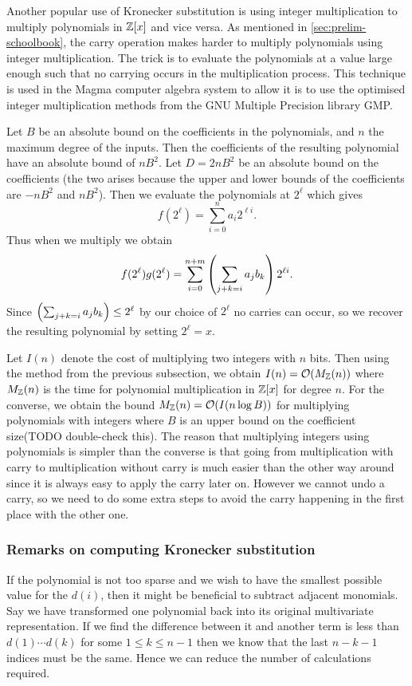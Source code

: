 Another popular use of Kronecker substitution is using integer multiplication to multiply polynomials in ${\mathbb Z}[x]$ and vice versa. As mentioned in \ref{sec:prelim-schoolbook}, the carry operation makes harder to multiply polynomials using integer multiplication. The trick is to evaluate the polynomials at a value large enough such that no carrying occurs in the multiplication process. This technique is used in the Magma computer algebra system to allow it is to use the optimised integer multiplication methods from the GNU Multiple Precision library GMP.

Let $B$ be an absolute bound on the coefficients in the polynomials, and $n$ the maximum degree of the inputs. Then the coefficients of the resulting polynomial have an absolute bound of $nB^2$. Let $D = 2nB^2$ be an absolute bound on the coefficients (the two arises because the upper and lower bounds of the coefficients are $-nB^2$ and $nB^2$). Then we evaluate the polynomials at $2^\ell$ which gives
\[
    f(2^\ell) = \sum^n_{i = 0} a_i 2^{\ell i}.
\]
Thus when we multiply we obtain
\[
    f(2^\ell)g(2^\ell) = \sum^{n+m}_{i=0} \left(\sum_{j + k = i} a_jb_k\right)2^{\ell i}.
\]
Since $\left(\sum_{j + k = i}a_j b_k\right) \leq 2^{\ell}$ by our choice of $2^\ell$ no carries can occur, so we recover the resulting polynomial by setting $2^\ell = x$.

Let $I(n)$ denote the cost of multiplying two integers with $n$ bits. Then using the method from the previous subsection, we obtain $I(n) = \mathcal O(M_{\mathbb Z}(n))$ where $M_{\mathbb Z}(n)$ is the time for polynomial multiplication in ${\mathbb Z}[x]$ for degree $n$. For the converse, we obtain the bound $M_{\mathbb Z}(n) = \mathcal O(I(n\log B))$ for multiplying polynomials with integers where $B$ is an upper bound on the coefficient size(TODO double-check this). The reason that multiplying integers using polynomials is simpler than the converse is that going from multiplication with carry to multiplication without carry is much easier than the other way around since it is always easy to apply the carry later on. However we cannot undo a carry, so we need to do some extra steps to avoid the carry happening in the first place with the other one.


\subsubsection{Remarks on computing Kronecker substitution}\label{subsec:kronecker-remarks}

If the polynomial is not too sparse and we wish to have the smallest possible value for the $d(i)$, then it might be beneficial to subtract adjacent monomials. Say we have transformed one polynomial back into its original multivariate representation. If we find the difference between it and another term is less than $d(1)\cdots d(k)$ for some $1 \le k \le n-1$ then we know that the last $n - k - 1$ indices must be the same. Hence we can reduce the number of calculations required.

